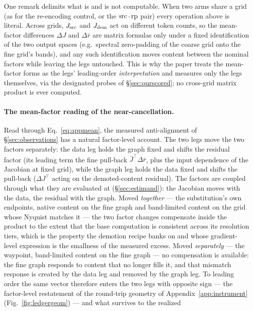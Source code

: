 One remark delimits what is and is not computable. When two arms
share a grid (as for the re-encoding control, or the $\mathrm{src}$--$\mathrm{rp}$
pair) every operation above is literal. Across grids, $J_{\mathrm{src}}$ and
$J_{\mathrm{dem}}$ act on different token counts, so the mean-factor
differences $\Delta J$ and $\Delta \bar r$ are matrix formulas only
under a fixed identification of the two output spaces (e.g.\ spectral
zero-padding of the coarse grid onto the fine grid's bands), and any
such identification moves content between the nominal factors while
leaving the legs untouched. This is why the paper treats the
mean-factor forms as the legs' leading-order \emph{interpretation}
and measures only the legs themselves, via the designated probes of
\S\ref{sec:ourscored}; no cross-grid matrix product is ever
computed.

\paragraph{The mean-factor reading of the near-cancellation.}
Read through Eq.~\ref{eq:appmean}, the measured anti-alignment of
\S\ref{sec:observations} has a natural factor-level account. The two
legs move the two factors separately: the data leg holds the graph
fixed and shifts the residual factor (its leading term the fine
pull-back $\bar J^{\!\top}\Delta\bar r$, plus the input dependence
of the Jacobian at fixed grid), while the graph leg holds the data
fixed and shifts the pull-back ($\Delta J^{\!\top}$ acting on the
demoted-content residual). The factors are coupled through what they
are evaluated at (\S\ref{sec:estimand}): the Jacobian moves with the
data, the residual with the graph. Moved \emph{together} --- the
substitution's own endpoints, native content on the fine graph and
band-limited content on the grid whose Nyquist matches it --- the
two factor changes compensate inside the product to the extent that
the base computation is consistent across its resolution tiers,
which is the property the demotion recipe banks on and whose
gradient-level expression is the smallness of the measured excess.
Moved \emph{separately} --- the waypoint, band-limited content on
the fine graph --- no compensation is available: the fine graph
responds to content that no longer fills it, and that mismatch
response is created by the data leg and removed by the graph leg. To
leading order the same vector therefore enters the two legs with
opposite sign --- the factor-level restatement of the round-trip
geometry of Appendix~\ref{app:instrument}
(Fig.~\ref{fig:ledgergeom}) --- and what survives to the realized
